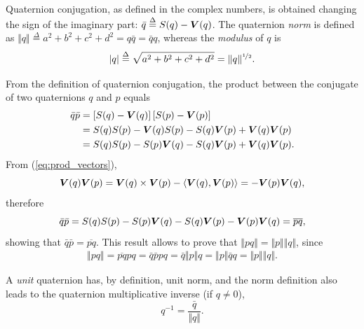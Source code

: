 Quaternion conjugation, as defined in the complex numbers, is obtained changing the sign of the imaginary part: $ \bar{q} \overset{\Delta}{=} S(q) - \boldsymbol{V}(q) $. The quaternion \textit{norm} is defined as $\Vert q \Vert \overset{\Delta}{=} a^2 + b^2 + c^2 + d^2 = q \bar{q} = \bar{q} q$, whereas the \textit{modulus} of $q$ \cite{ell2014quaternion} is
\begin{equation}
\label{eq:modulusq}
|q| \overset{\Delta}{=} \sqrt{a^2 + b^2 + c^2 + d^2} = \Vert q \Vert^{\nicefrac{1}{2}}.
\end{equation}

From the definition of quaternion conjugation, the product between the conjugate of two quaternions $q$ and $p$ equals
\begin{equation}
\begin{aligned}
\bar{q} \bar{p} &=
\left[ S(q) - \boldsymbol{V}(q) \right] \left[ S(p) - \boldsymbol{V}(p) \right] \\
&= S(q)S(p) - \boldsymbol{V}(q) S(p) - S(q) \boldsymbol{V}(p) + \boldsymbol{V}(q)\boldsymbol{V}(p) \\
&= S(q)S(p) - S(p)\boldsymbol{V}(q) - S(q) \boldsymbol{V}(p) + \boldsymbol{V}(q)\boldsymbol{V}(p).
\end{aligned}
\end{equation}
From (\ref{eq:prod_vectors}),
\begin{equation}
\boldsymbol{V}(q) \boldsymbol{V}(p) = 
\boldsymbol{V}(q) \times \boldsymbol{V}(p) - \langle\boldsymbol{V}(q), \boldsymbol{V}(p)\rangle =
- \boldsymbol{V}(p) \boldsymbol{V}(q),
\end{equation}
therefore
\begin{equation}
\bar{q} \bar{p} =
S(q)S(p) - S(p)\boldsymbol{V}(q) - S(q) \boldsymbol{V}(p) - \boldsymbol{V}(p)\boldsymbol{V}(q) =
\overline{p q},
\end{equation}
showing that $\bar{q} \bar{p} = \overline{p q}$. This result allows to prove that $\Vert p q \Vert = \Vert p \Vert \Vert q \Vert$, since
\begin{equation}
\label{eq:normproduct}
\begin{aligned}
\Vert pq \Vert = \overline{pq} pq = \bar{q} \bar{p} p q = \bar{q} \Vert p \Vert q = \Vert p \Vert \bar{q} q =
\Vert p \Vert \Vert q \Vert.
\end{aligned}
\end{equation}

A \textit{unit} quaternion has, by definition, unit norm, and the norm definition also leads to the quaternion multiplicative inverse (if $q \neq 0$),
\begin{equation}
q^{-1} = \frac{\bar{q}}{\Vert q \Vert}.
\end{equation}

